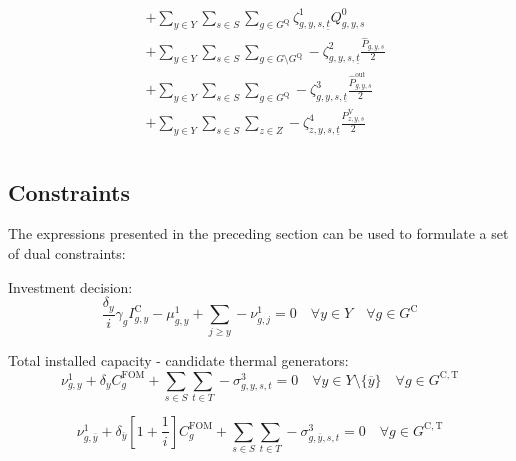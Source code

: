 \documentclass{article}
\newcommand{\sGenerators}{G}
\newcommand{\sGeneratorsCandidate}{G^{\mathrm{C}}}
\newcommand{\sGeneratorsCandidateThermal}{G^{\mathrm{C,T}}}
\newcommand{\sStorage}{G^{\mathrm{Q}}}
\newcommand{\sYears}{Y}
\newcommand{\sScenarios}{S}
\newcommand{\sIntervals}{T}
\newcommand{\sZones}{Z}
\newcommand{\iGenerator}{g}
\newcommand{\iYear}{y}
\newcommand{\iYearTerminal}{\overline{\iYear}}
\newcommand{\iYearAlias}{j}
\newcommand{\iScenario}{s}
\newcommand{\iInterval}{t}
\newcommand{\iIntervalStart}{\underline{\iInterval}}
\newcommand{\iZone}{z}
\newcommand{\cFixedOperationsMaintenanceCostGenerator}[1][\iGenerator]{C^{\mathrm{FOM}}_{#1}}
\newcommand{\cAmortisationRate}[1][\iGenerator]{\gamma_{#1}}
\newcommand{\cCandidateInvestmentCost}[1][\iGenerator,\iYear]{I^{\mathrm{C}}_{#1}}
\newcommand{\cInterestRate}{i}
\newcommand{\cDiscountRate}[1][\iYear]{\delta_{#1}}
\newcommand{\cPowerInitial}[1][\iGenerator,\iYear,\iScenario]{\hat{P}_{#1}}
\newcommand{\cPowerOutInitial}[1][\iGenerator,\iYear,\iScenario]{\hat{P}_{#1}^{\mathrm{out}}}
\newcommand{\cStorageEnergyInitial}[1][\iGenerator,\iYear,\iScenario]{Q_{#1}^{0}}
\newcommand{\cLostLoadPowerInitial}[1][\iZone,\iYear,\iScenario]{P_{#1}^{\mathrm{V}}}
\newcommand{\dNonNegativeCandidateCapacity}[1][\iGenerator,\iYear]{\mu_{#1}^{1}}
\newcommand{\dTotalInstallCapacity}[1][\iGenerator,\iYear]{\nu_{#1}^{1}}
\newcommand{\dMaxPowerOutputCandidateThermal}[1][\iGenerator,\iYear,\iScenario,\iInterval]{\sigma_{#1}^{3}}
\newcommand{\dStorageEnergyTransition}[1][\iGenerator,\iYear,\iScenario,\iInterval]{\zeta_{#1}^{1}}
\newcommand{\dGeneratorEnergyOutput}[1][\iGenerator,\iYear,\iScenario,\iInterval]{\zeta_{#1}^{2}}
\newcommand{\dStorageEnergyOutput}[1][\iGenerator,\iYear,\iScenario,\iInterval]{\zeta_{#1}^{3}}
\newcommand{\dLostLoadEnergy}[1][\iZone,\iYear,\iScenario,\iInterval]{\zeta_{#1}^{4}}
\begin{document}
\begin{align}
\begin{split}
& + \sum\limits_{\iYear \in \sYears}\sum\limits_{\iScenario \in \sScenarios}\sum\limits_{\iGenerator \in \sStorage} \dStorageEnergyTransition[\iGenerator,\iYear,\iScenario,\iIntervalStart] \cStorageEnergyInitial\\
& + \sum\limits_{\iYear \in \sYears}\sum\limits_{\iScenario \in \sScenarios}\sum\limits_{\iGenerator \in \sGenerators \setminus \sStorage} - \dGeneratorEnergyOutput[\iGenerator, \iYear,\iScenario,\iIntervalStart] \frac{\cPowerInitial}{2}\\
& + \sum\limits_{\iYear \in \sYears}\sum\limits_{\iScenario \in \sScenarios}\sum\limits_{\iGenerator \in \sStorage} - \dStorageEnergyOutput[\iGenerator, \iYear,\iScenario,\iIntervalStart] \frac{\cPowerOutInitial}{2}\\
& + \sum\limits_{\iYear \in \sYears}\sum\limits_{\iScenario \in \sScenarios}\sum\limits_{\iZone \in \sZones} - \dLostLoadEnergy[\iZone, \iYear,\iScenario,\iIntervalStart] \frac{\cLostLoadPowerInitial}{2}\\
\end{split}
\end{align}

\subsection{Constraints}
The expressions presented in the preceding section can be used to formulate a set of dual constraints:

Investment decision:
\begin{equation}
\frac{\cDiscountRate}{\cInterestRate} \cAmortisationRate \cCandidateInvestmentCost - \dNonNegativeCandidateCapacity + \sum\limits_{\iYearAlias \geq \iYear} -\dTotalInstallCapacity[\iGenerator,\iYearAlias] = 0 \quad \forall \iYear \in \sYears \quad \forall \iGenerator \in \sGeneratorsCandidate
\end{equation}

Total installed capacity - candidate thermal generators:
\begin{equation}
 \dTotalInstallCapacity + \cDiscountRate \cFixedOperationsMaintenanceCostGenerator + \sum\limits_{\iScenario \in \sScenarios}\sum\limits_{\iInterval \in \sIntervals} - \dMaxPowerOutputCandidateThermal = 0 \quad \forall \iYear \in \sYears \setminus \{\iYearTerminal\} \quad \forall \iGenerator \in \sGeneratorsCandidateThermal
\end{equation}

\begin{equation}
\dTotalInstallCapacity[\iGenerator,\iYearTerminal] + \cDiscountRate[\iYearTerminal] \left[1 + \frac{1}{\cInterestRate}\right] \cFixedOperationsMaintenanceCostGenerator + \sum\limits_{\iScenario \in \sScenarios}\sum\limits_{\iInterval \in \sIntervals} - \dMaxPowerOutputCandidateThermal[\iGenerator,\iYearTerminal,\iScenario,\iInterval] = 0 \quad \forall \iGenerator \in \sGeneratorsCandidateThermal
\end{equation}
\end{document}
